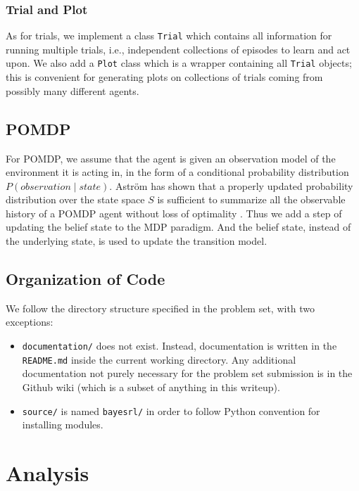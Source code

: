 \documentclass{pset}
\begin{document}
\subsubsection{Trial and Plot}
As for trials, we implement a class \texttt{Trial} which contains all information for running multiple trials, i.e., independent collections of episodes to learn and act upon. We also add a \texttt{Plot} class which is a wrapper containing all \texttt{Trial} objects; this is convenient for generating plots on collections of trials coming from possibly many different agents.

\subsection{POMDP}
For POMDP, we assume that the agent is given an observation model of the
environment it is acting in, in the form of a conditional probability distribution
$P(observation \mid state)$. Astr\"{o}m has shown that a properly updated probability
distribution over the state space $S$ is sufficient to summarize all the observable
history of a POMDP agent without loss of optimality \cite{astrom1965optimal}. 
Thus we add a step of updating the belief state to the MDP paradigm. And the belief state, instead
of the underlying state, is used to update the transition model.

\subsection{Organization of Code}
We follow the directory structure specified in the problem set, with two
exceptions:
\begin{itemize}
\item \texttt{documentation/} does not exist. Instead, documentation is written
in the \texttt{README.md} inside the current working directory. Any additional
documentation not purely necessary for the problem set submission is in the
Github wiki (which is a subset of anything in this writeup).
\item \texttt{source/} is named \texttt{bayesrl/} in order to follow Python
convention for installing modules.
\end{itemize}

\section{Analysis}
\end{document}
